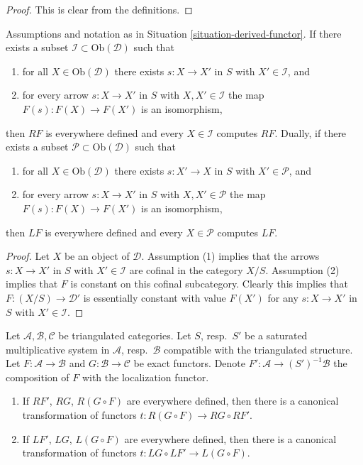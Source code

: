 \begin{proof}
This is clear from the definitions.
\end{proof}

\begin{lemma}
\label{lemma-find-existence-computes}
Assumptions and notation as in
Situation \ref{situation-derived-functor}.
If there exists a subset $\mathcal{I} \subset \text{Ob}(\mathcal{D})$
such that
\begin{enumerate}
\item for all $X \in \text{Ob}(\mathcal{D})$
there exists $s : X \to X'$ in $S$ with $X' \in \mathcal{I}$,
and
\item for every arrow $s : X \to X'$ in $S$ with $X, X' \in \mathcal{I}$
the map $F(s) : F(X) \to F(X')$ is an isomorphism,
\end{enumerate}
then $RF$ is everywhere defined and every $X \in \mathcal{I}$
computes $RF$. Dually, if there exists a subset
$\mathcal{P} \subset \text{Ob}(\mathcal{D})$
such that
\begin{enumerate}
\item for all $X \in \text{Ob}(\mathcal{D})$
there exists $s : X' \to X$ in $S$ with $X' \in \mathcal{P}$,
and
\item for every arrow $s : X \to X'$ in $S$ with $X, X' \in \mathcal{P}$
the map $F(s) : F(X) \to F(X')$ is an isomorphism,
\end{enumerate}
then $LF$ is everywhere defined and every $X \in \mathcal{P}$
computes $LF$.
\end{lemma}

\begin{proof}
Let $X$ be an object of $\mathcal{D}$.
Assumption (1) implies that the arrows $s : X \to X'$ in $S$ with
$X' \in \mathcal{I}$ are cofinal in the category $X/S$. Assumption
(2) implies that $F$ is constant on this cofinal subcategory.
Clearly this implies that $F : (X/S) \to \mathcal{D}'$ is essentially
constant with value $F(X')$ for any $s : X \to X'$ in $S$
with $X' \in \mathcal{I}$.
\end{proof}

\begin{lemma}
\label{lemma-compose-derived-functors-general}
Let $\mathcal{A}, \mathcal{B}, \mathcal{C}$ be triangulated categories.
Let $S$, resp.\ $S'$ be a saturated multiplicative system in
$\mathcal{A}$, resp.\ $\mathcal{B}$ compatible with the triangulated structure.
Let $F : \mathcal{A} \to \mathcal{B}$ and $G : \mathcal{B} \to \mathcal{C}$
be exact functors. Denote $F' : \mathcal{A} \to (S')^{-1}\mathcal{B}$ the
composition of $F$ with the localization functor.
\begin{enumerate}
\item If $RF'$, $RG$, $R(G \circ F)$ are everywhere defined, then there
is a canonical transformation of functors
$t : R(G \circ F) \longrightarrow RG \circ RF'$.
\item If $LF'$, $LG$, $L(G \circ F)$ are everywhere defined, then there
is a canonical transformation of functors
$t : LG \circ LF' \to L(G \circ F)$.
\end{enumerate}
\end{lemma}

